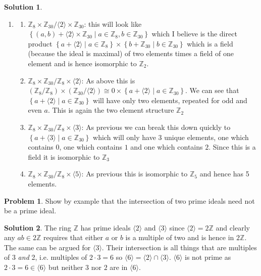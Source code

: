 \documentclass[10pt]{article}
\theoremstyle{definition}
\newtheorem{problem}{Problem}
\newtheorem{soln}{Solution}
\newcommand{\hull}[1]{\langle {#1}\rangle}
\begin{document}
\begin{soln}
\begin{enumerate}[label=(\alph*)]
          always zero, hence giving no zero divisors. This means that the maximal ideals of $\mathbb{Z}_8\times \mathbb{Z}_{30}$ can only
          be
          $\hull{2}\times \mathbb{Z}_{30}$, $\mathbb{Z}_8\times \hull{2},\hull{3},\hull{5}$.
    \item \begin{enumerate}[label=(\roman*)]
            \item $\mathbb{Z}_8\times \mathbb{Z}_{30}/\hull{2}\times \mathbb{Z}_{30}$:
                  this will look like $\left\{(a,b)+\hull{2}\times \mathbb{Z}_{30}\mid a\in\mathbb{Z}_8, b\in\mathbb{Z}_{30}\right\}$
                  which I believe is the direct product
                  $\left\{a+\hull{2}\mid a\in\mathbb{Z}_8\right\}\times \left\{b+\mathbb{Z}_{30}\mid b\in\mathbb{Z}_{30}\right\}$
                  which is a field (because the ideal is maximal) of two elements times a field of one element and is hence isomorphic to $\mathbb{Z}_2$.
            \item $\mathbb{Z}_8\times \mathbb{Z}_{30}/\mathbb{Z}_8\times \hull{2}$:
                  As above this is $(\mathbb{Z}_8/\mathbb{Z}_8)\times(\mathbb{Z}_{30}/\hull{2})\cong {0}\times \left\{a+\hull{2}\mid a\in\mathbb{Z}_{30}\right\}$.
                  We can see that $\left\{a+\hull{2}\mid a\in\mathbb{Z}_{30}\right\}$ will have only two elements, repeated for odd and even $a$. This is again the two element
                  structure $\mathbb{Z}_2$
            \item $\mathbb{Z}_8\times \mathbb{Z}_{30}/\mathbb{Z}_8\times \hull{3}$: As previous we can break this down quickly to
                  $\left\{a+\hull{3}\mid a\in\mathbb{Z}_{30}\right\}$ which will only have 3 unique elements, one which contains $0$, one which contains $1$ and one which contains $2$.
                  Since this is a field it is isomorphic to $\mathbb{Z}_3$
            \item $\mathbb{Z}_8\times \mathbb{Z}_{30}/\mathbb{Z}_8\times \hull{5}$: As previous this is isomorphic to $\mathbb{Z}_5$ and hence has 5 elements.
          \end{enumerate}
  \end{enumerate}
\end{soln}

\begin{problem}
Show by example that the intersection of two prime ideals need not
be a prime ideal.
\end{problem}
\begin{soln}
  The ring $\mathbb{Z}$ has prime ideals $\hull{2}$ and $\hull{3}$ since
  $\hull{2}=2\mathbb{Z}$ and clearly any $ab\in 2\mathbb{Z}$ requires that either
  $a$ or $b$ is a multiple of two and is hence in $2\mathbb{Z}$. The same can be argued for
  $\hull{3}$. Their intersection is all things that are multiples of 3 \emph{and} 2, i.e.
  multiples of $2\cdot 3=6$ so $\hull{6}=\hull{2}\cap \hull{3}$. $\hull{6}$ is not prime as
  $2\cdot3=6\in \hull{6}$ but neither $3$ nor $2$ are in $\hull{6}$.
\end{soln}
\end{document}
